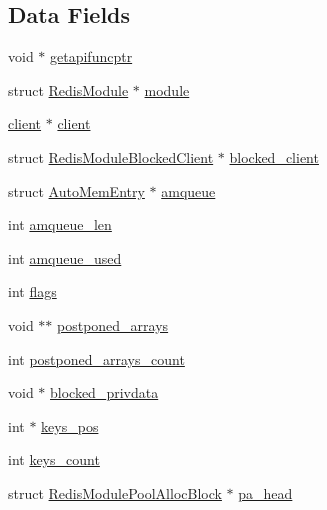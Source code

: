 \subsection*{Data Fields}
\begin{DoxyCompactItemize}
\item 
void $\ast$ \hyperlink{struct_redis_module_ctx_ac6329d63f19c6310742a84c334627e6f}{getapifuncptr}
\item 
struct \hyperlink{struct_redis_module}{Redis\+Module} $\ast$ \hyperlink{struct_redis_module_ctx_a0b5d3833feb2320585734795fb7f62b6}{module}
\item 
\hyperlink{structclient}{client} $\ast$ \hyperlink{struct_redis_module_ctx_a6d99956d3d06c98958feb17baf491c71}{client}
\item 
struct \hyperlink{struct_redis_module_blocked_client}{Redis\+Module\+Blocked\+Client} $\ast$ \hyperlink{struct_redis_module_ctx_af1859b71d91af8412370224b3a37b1dc}{blocked\+\_\+client}
\item 
struct \hyperlink{struct_auto_mem_entry}{Auto\+Mem\+Entry} $\ast$ \hyperlink{struct_redis_module_ctx_add0d0fd5c12e402e4decbaf015619d1c}{amqueue}
\item 
int \hyperlink{struct_redis_module_ctx_a85eb81641193eff3e499ff05da42f752}{amqueue\+\_\+len}
\item 
int \hyperlink{struct_redis_module_ctx_af5e94a4bf2e602db90d341b3483b71ab}{amqueue\+\_\+used}
\item 
int \hyperlink{struct_redis_module_ctx_ac8bf36fe0577cba66bccda3a6f7e80a4}{flags}
\item 
void $\ast$$\ast$ \hyperlink{struct_redis_module_ctx_aeb39a4536bdedc8392cdda36e7380c22}{postponed\+\_\+arrays}
\item 
int \hyperlink{struct_redis_module_ctx_a3eb93de851bb356c791e34b7b0cd4bde}{postponed\+\_\+arrays\+\_\+count}
\item 
void $\ast$ \hyperlink{struct_redis_module_ctx_a5d0fe014667071528b4f68c65b085808}{blocked\+\_\+privdata}
\item 
int $\ast$ \hyperlink{struct_redis_module_ctx_a559d6c952058c05bc208033d3d3576d1}{keys\+\_\+pos}
\item 
int \hyperlink{struct_redis_module_ctx_a24bb9d3a9dccb24581d359a218837c6f}{keys\+\_\+count}
\item 
struct \hyperlink{struct_redis_module_pool_alloc_block}{Redis\+Module\+Pool\+Alloc\+Block} $\ast$ \hyperlink{struct_redis_module_ctx_ad70f06a690907f850f125ae974b0aeed}{pa\+\_\+head}
\end{DoxyCompactItemize}


